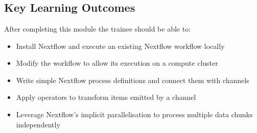 \setModuleContributions{%
}

\chapter{\moduleTitle}
\newpage


%
\section{Key Learning Outcomes}

After completing this module the trainee should be able to:
\begin{itemize}
  \item Install Nextflow and execute an existing Nextflow workflow locally
  \item Modify the workflow to allow its execution on a compute cluster
  \item Write simple Nextflow process definitions and connect them with channels
  \item Apply operators to transform items emitted by a channel
  \item Leverage Nextflow's implicit parallelisation to process multiple data chunks independently
\end{itemize}

